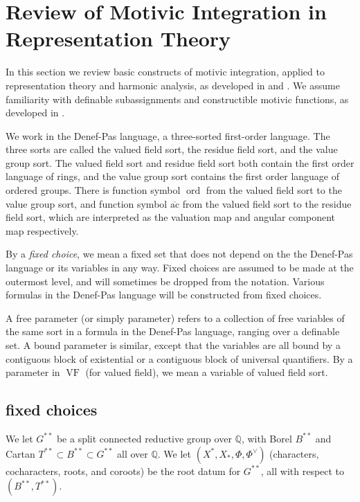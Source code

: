 \documentclass[12pt]{amsart}
\newcommand{\op}[1]{\operatorname{#1}}
\newcommand{\ring}[1]{{\mathbb #1}}
\def\VF{{\op{VF}}}
\newcommand\ac{\overline{\mathrm{ac}}}
\theoremstyle{plain}
\theoremstyle{definition}
\begin{document}
\section{Review of Motivic Integration in Representation Theory}

In this section we review basic constructs of motivic integration,
applied to representation
theory and harmonic analysis, as developed in \cite{CHL} and
\cite{CGH}.  We assume familiarity with definable subassignments and
constructible motivic functions, as developed in \cite{CL}.

We work in the Denef-Pas language, a three-sorted first-order
language.  The three sorts are called the valued field sort, the
residue field sort, and the value group sort.  The valued field sort
and residue field sort both contain the first order language of rings,
and the value group sort contains the first order language of ordered
groups.  There is function symbol $\op{ord}$ from the valued field
sort to the value group sort, and function symbol $\ac$ from the
valued field sort to the residue field sort, which are interpreted as
the valuation map and angular component map respectively.

By a {\it fixed choice}, we mean a fixed set that does not depend
on the the Denef-Pas language or its variables in any way.  Fixed
choices are assumed to be made at the outermost level, and
will sometimes be dropped from the notation.  Various formulas
in the Denef-Pas language will be constructed from fixed choices.

A free parameter (or simply parameter) refers to a collection of free
variables of the same sort in a formula in the Denef-Pas language,
ranging over a definable set.  A bound parameter is similar, except
that the variables are all bound by a contiguous block of existential
or a contiguous block of universal quantifiers.  By a parameter in
$\VF$ (for valued field), we mean a variable of valued field sort.


\subsection{fixed choices}\label{sec:fixed}

We let $G^{**}$ be a split connected reductive group over $\ring{Q}$,
with Borel $B^{**}$ and Cartan $T^{**}\subset B^{**} \subset G^{**}$
all over $\ring{Q}$.  We let $(X^*,X_*,\Phi,\Phi^\vee)$ (characters,
cocharacters, roots, and coroots) be the root
datum for $G^{**}$,
all with respect to
$(B^{**},T^{**})$.  
\end{document}
